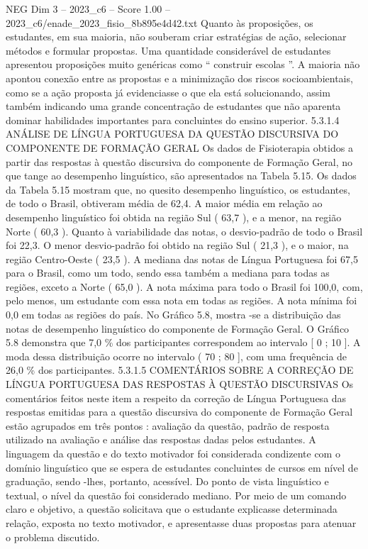 \begin{textsample}{NEG Dim 3 – 2023\_c6 – Score 1.00 – 2023\_c6/enade\_2023\_fisio\_8b895e4d42.txt}
Quanto às proposições, os estudantes, em sua maioria, não souberam criar estratégias de ação, selecionar métodos e formular propostas.
Uma quantidade considerável de estudantes apresentou proposições muito genéricas como “ construir escolas ”.
A maioria não apontou conexão entre as propostas e a minimização dos riscos socioambientais, como se a ação proposta já evidenciasse o que ela está solucionando, assim também indicando uma grande concentração de estudantes que não aparenta dominar habilidades importantes para concluintes do ensino superior. 5.3.1.4 ANÁLISE DE LÍNGUA PORTUGUESA DA QUESTÃO DISCURSIVA DO COMPONENTE DE FORMAÇÃO GERAL Os dados de Fisioterapia obtidos a partir das respostas à questão discursiva do componente de Formação Geral, no que tange ao desempenho linguístico, são apresentados na Tabela 5.15.
Os dados da Tabela 5.15 mostram que, no quesito desempenho linguístico, os estudantes, de todo o Brasil, obtiveram média de 62,4.
A maior média em relação ao desempenho linguístico foi obtida na região Sul ( 63,7 ), e a menor, na região Norte ( 60,3 ).
Quanto à variabilidade das notas, o desvio-padrão de todo o Brasil foi 22,3.
O menor desvio-padrão foi obtido na região Sul ( 21,3 ), e o maior, na região Centro-Oeste ( 23,5 ).
A mediana das notas de Língua Portuguesa foi 67,5 para o Brasil, como um todo, sendo essa também a mediana para todas as regiões, exceto a Norte ( 65,0 ).
A nota máxima para todo o Brasil foi 100,0, com, pelo menos, um estudante com essa nota em todas as regiões.
A nota mínima foi 0,0 em todas as regiões do país.
No Gráfico 5.8, mostra -se a distribuição das notas de desempenho linguístico do componente de Formação Geral.
O Gráfico 5.8 demonstra que 7,0 \% dos participantes correspondem ao intervalo [ 0 ; 10 ].
A moda dessa distribuição ocorre no intervalo ( 70 ; 80 ], com uma frequência de 26,0 \% dos participantes. 5.3.1.5 COMENTÁRIOS SOBRE A CORREÇÃO DE LÍNGUA PORTUGUESA DAS RESPOSTAS À QUESTÃO DISCURSIVAS Os comentários feitos neste item a respeito da correção de Língua Portuguesa das respostas emitidas para a questão discursiva do componente de Formação Geral estão agrupados em três pontos : avaliação da questão, padrão de resposta utilizado na avaliação e análise das respostas dadas pelos estudantes.
A linguagem da questão e do texto motivador foi considerada condizente com o domínio linguístico que se espera de estudantes concluintes de cursos em nível de graduação, sendo -lhes, portanto, acessível.
Do ponto de vista linguístico e textual, o nível da questão foi considerado mediano.
Por meio de um comando claro e objetivo, a questão solicitava que o estudante explicasse determinada relação, exposta no texto motivador, e apresentasse duas propostas para atenuar o problema discutido.

\end{textsample}
